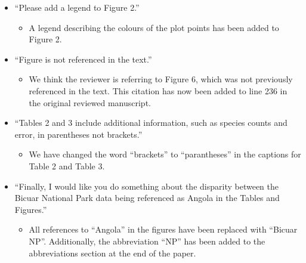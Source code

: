 \documentclass[a4paper]{letter}
\begin{document}
\begin{letter}{}
\begin{itemize}
\begin{itemize}
		\end{itemize}
	\item{``Please add a legend to Figure 2.''}
		\begin{itemize}
			\item{A legend describing the colours of the plot points has been added to Figure 2.}
		\end{itemize}
	\item{``Figure is not referenced in the text.''}
		\begin{itemize}
			\item{We think the reviewer is referring to Figure 6, which was not previously referenced in the text. This citation has now been added to line 236 in the original reviewed manuscript.}
		\end{itemize}
	\item{``Tables 2 and 3 include additional information, such as species counts and error, in parentheses not brackets.''}
		\begin{itemize}
			\item{We have changed the word ``brackets'' to ``parantheses'' in the captions for Table 2 and Table 3.}
		\end{itemize}
	\item{``Finally, I would like you do something about the disparity between the Bicuar National Park data being referenced as Angola in the Tables and Figures.''}
		\begin{itemize}
			\item{All references to ``Angola'' in the figures have been replaced with ``Bicuar NP''. Additionally, the abbreviation ``NP'' has been added to the abbreviations section at the end of the paper.}
		\end{itemize}
\end{itemize}




\end{letter}
 
\end{document}
